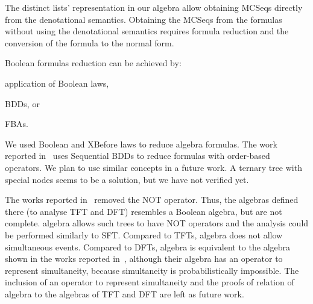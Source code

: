 %
%
%
%

The distinct lists' representation in our algebra allow obtaining \acp{MCSeq} directly from the denotational semantics.
Obtaining the \acp{MCSeq} from the formulas without using the denotational semantics requires formula reduction and the conversion of the formula to the normal form.

Boolean formulas reduction can be achieved by: 
\begin{alineasinline}
  \item application of Boolean laws, 
  \item \acp{BDD}, or 
  \item \acp{FBA}.
\end{alineasinline}
%
We used Boolean and \ac{XBefore} laws to reduce \ac{algebra} formulas.
%
The work reported in~\cite{TXD2011,XTD2012} uses Sequential BDDs to reduce formulas with order-based operators.
%
We plan to use similar concepts in a future work.
A ternary tree with special nodes seems to be a solution, but we have not verified yet.

The works reported in~\cite{Merle2010,MRL+2010,MRL2011,Walker2009,WP2009} removed the \ac{NOT} operator.
Thus, the algebras defined there (to analyse \ac{TFT} and \ac{DFT}) resembles a Boolean algebra, but are not complete. 
\Ac{algebra} allows such trees to have \ac{NOT} operators and the analysis could be performed similarly to \ac{SFT}.
Compared to \acp{TFT}, \ac{algebra} does not allow simultaneous events.
Compared to \acp{DFT}, \ac{algebra} is equivalent to the algebra shown in the works reported in~\cite{MRL2011b,Merle2010}, although their algebra has an operator to represent simultaneity, because simultaneity is probabilistically impossible.
The inclusion of an operator to represent simultaneity and the proofs of relation of \ac{algebra} to the algebras of \ac{TFT} and \ac{DFT} are left as future work.

